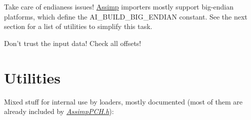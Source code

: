 \begin{DoxyItemize}
\item Take care of endianess issues! \hyperlink{class_assimp}{Assimp} importers mostly support big-\/endian platforms, which define the {\ttfamily A\+I\+\_\+\+B\+U\+I\+L\+D\+\_\+\+B\+I\+G\+\_\+\+E\+N\+D\+I\+A\+N} constant. See the next section for a list of utilities to simplify this task.  
\item Don't trust the input data! Check all offsets!  
\end{DoxyItemize}\hypertarget{extend_util}{}\section{Utilities}\label{extend_util}
Mixed stuff for internal use by loaders, mostly documented (most of them are already included by {\itshape \hyperlink{_assimp_p_c_h_8h}{Assimp\+P\+C\+H.\+h}})\+: 
